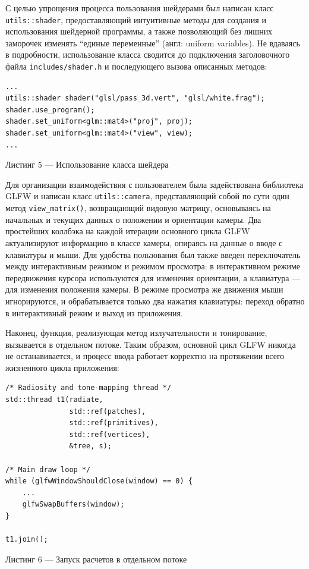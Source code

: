 \documentclass[12pt]{article}
\begin{document}
С целью упрощения процесса пользования шейдерами был написан класс \texttt{utils::shader}, предоставляющий интуитивные методы для создания и использования шейдерной программы, а также позволяющий без лишних заморочек изменять ``единые переменные'' (англ: uniform variables). Не вдаваясь в подробности, использование класса сводится до подключения заголовочного файла \texttt{includes/shader.h} и последующего вызова описанных методов:
\begin{lstlisting}
...
utils::shader shader("glsl/pass_3d.vert", "glsl/white.frag");
shader.use_program();
shader.set_uniform<glm::mat4>("proj", proj);
shader.set_uniform<glm::mat4>("view", view);
...
\end{lstlisting}
\begin{center}Листинг 5 --- Использование класса шейдера\end{center}

Для организации взаимодействия с пользователем была задействована библиотека GLFW и написан класс \texttt{utils::camera}, представляющий собой по сути один метод \texttt{view\_matrix()}, возвращающий видовую матрицу, основываясь на начальных и текущих данных о положении и ориентации камеры. Два простейших коллбэка на каждой итерации основного цикла GLFW актуализируют информацию в классе камеры, опираясь на данные о вводе с клавиатуры и мыши. Для удобства пользования был также введен переключатель между интерактивным режимом и режимом просмотра: в интерактивном режиме передвижения курсора используются для изменения ориентации, а клавиатура --- для изменения положения камеры. В режиме просмотра же движения мыши игнорируются, и обрабатывается только два нажатия клавиатуры: переход обратно в интерактивный режим и выход из приложения.

Наконец, функция, реализующая метод излучательности и тонирование, вызывается в отдельном потоке. Таким образом, основной цикл GLFW никогда не останавивается, и процесс ввода работает корректно на протяжении всего жизненного цикла приложения:
\begin{lstlisting}
/* Radiosity and tone-mapping thread */
std::thread t1(radiate,
               std::ref(patches),
               std::ref(primitives),
               std::ref(vertices),
               &tree, s);

/* Main draw loop */
while (glfwWindowShouldClose(window) == 0) {
    ...
    glfwSwapBuffers(window);
}

t1.join();
\end{lstlisting}
\begin{center}Листинг 6 --- Запуск расчетов в отдельном потоке\end{center}
\end{document}

